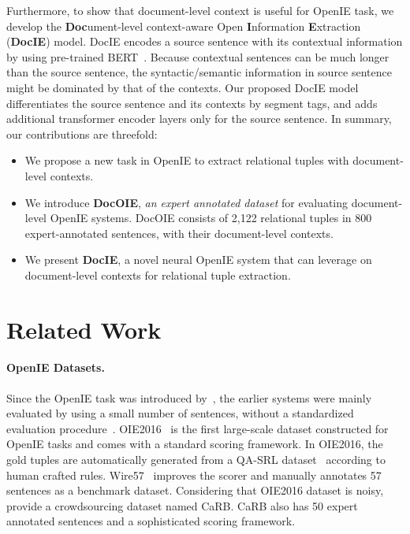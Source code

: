 \documentclass[11pt,a4paper]{article}
\newcommand{\dname}{DocOIE\xspace}
\newcommand{\mname}{DocIE\xspace}
\begin{document}
Furthermore, to show that document-level context is useful for OpenIE task, we develop  the \textbf{Doc}ument-level context-aware Open \textbf{I}nformation \textbf{E}xtraction (\textbf{\mname}) model. \mname encodes a source sentence with its contextual information by using pre-trained BERT~\cite{devlin2018bert}. Because contextual sentences can be much longer than the source sentence, the syntactic/semantic information in source sentence might be dominated by that of the contexts. Our proposed \mname model differentiates the source sentence and its contexts by segment tags, and adds additional transformer encoder layers only for the source sentence. In summary, our contributions are threefold:
\begin{itemize}[noitemsep,leftmargin=5.5mm]
  \item We propose a new task in OpenIE to extract relational tuples with document-level contexts.
  \item We introduce \textbf{\dname}, \textit{an expert annotated dataset} for evaluating document-level OpenIE systems. \dname consists of 2,122 relational tuples in 800 expert-annotated sentences, with their document-level contexts.
  \item We present \textbf{\mname}, a novel neural OpenIE system that can leverage on document-level contexts for relational tuple extraction. 
\end{itemize}



\section{Related Work}
\label{sec:related}
\paragraph{OpenIE Datasets.} Since the OpenIE task was introduced by~\citet{yates2007textrunner}, the earlier systems were mainly evaluated by using a small number of sentences, without a standardized evaluation procedure~\cite{niklaus-etal-2018-survey}. OIE2016~\cite{stanovsky2016creating} is the first large-scale dataset constructed for OpenIE tasks and comes with a standard scoring framework. In OIE2016, the gold tuples are automatically generated from a QA-SRL dataset~\cite{he2015question} according to human crafted rules. Wire57~\cite{lechelle2018wire57} improves the scorer and manually annotates 57 sentences as a benchmark dataset. Considering that OIE2016 dataset is noisy, \citet{bhardwaj2019carb} provide a crowdsourcing dataset named CaRB. CaRB also has 50 expert annotated sentences and a sophisticated scoring framework.
\end{document}
